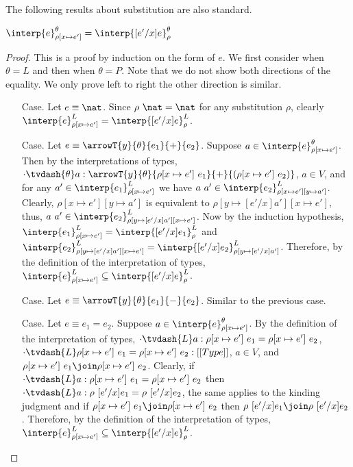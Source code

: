 \noindent
The following results about substitution are also standard.
\begin{lemma}
  \label{lemma:movable_subs}
  $\interp{e}^\theta_{\rho[x \mapsto e']} = \interp{[e'/x]e}^\theta_\rho$
\end{lemma}
\begin{proof}
  This is a proof by induction on the form of $e$.  We first consider when $\theta = L$ and
  then when $\theta = P$.  Note that we do not show both directions of the equality.  We only
  prove left to right the other direction is similar.
  
  \begin{itemize}
  \item[Case.] Let $e \equiv \nat$.  
    Since $\rho\ \nat = \nat$ for any substitution $\rho$, clearly
    $\interp{e}^L_{\rho[x \mapsto e']} = \interp{[e'/x]e}^L_\rho$.

  \item[Case.] Let $e \equiv \arrowT{y}{\theta}{e_1}{+}{e_2}$.  Suppose 
    $a \in \interp{e}^\theta_{\rho[x \mapsto e']}$.  Then by the interpretations of types,
    $\cdot \tvdash{\theta} a:
    \arrowT{y}{\theta}{\rho[x \mapsto e']\ e_1}{+}{(\rho[x \mapsto e']\ e_2)}$, 
    $a \in V$,
    and for any $a' \in \interp{e_1}^L_{\rho[x \mapsto e']}$ we have 
    $a\ a' \in \interp{e_2}^L_{\rho[x \mapsto e'][y \mapsto a']}$.  Clearly, 
    $\rho[x \mapsto e'][y \mapsto a']$ is equivalent to
    $\rho[y \mapsto [e'/x]a'][x \mapsto e']$, thus, 
    $a\ a' \in \interp{e_2}^L_{\rho[y \mapsto [e'/x]a'][x \mapsto e']}$.  Now by the induction
    hypothesis, $\interp{e_1}^L_{\rho[x \mapsto e']} = \interp{[e'/x]e_1}^L_{\rho}$ and
    $\interp{e_2}^L_{\rho[y \mapsto [e'/x]a'][x \mapsto e']} = 
    \interp{[e'/x]e_2}^L_{\rho[y \mapsto [e'/x]a']}$.  Therefore, by the definition of the 
    interpretation of types, $\interp{e}^L_{\rho[x \mapsto e']} \subseteq \interp{[e'/x]e}^L_\rho$.

  \item[Case.]  Let $e \equiv \arrowT{y}{\theta}{e_1}{-}{e_2}$.  Similar to the previous case.

  \item[Case.] Let $e \equiv e_1 = e_2$.  Suppose $a \in \interp{e}^\theta_{\rho[x \mapsto e']}$.
    By the definition of the interpretation of types, 
    $\cdot \tvdash{L} a:\rho[x \mapsto e']\ e_1 = \rho[x \mapsto e']\ e_2$, 
    $\cdot \tvdash{L} \rho[x \mapsto e']\ e_1 = \rho[x \mapsto e']\ e_2:[[Type]]$,
    $a \in V$, 
    and $\rho[x \mapsto e']\ e_1 \join \rho[x \mapsto e']\ e_2$.  Clearly, if 
    $\cdot \tvdash{L} a:\rho[x \mapsto e']\ e_1 = \rho[x \mapsto e']\ e_2$ then
    $\cdot \tvdash{L} a:\rho\ [e'/x]e_1 = \rho\ [e'/x]e_2$, the same applies to the kinding
    judgment and
    if $\rho[x \mapsto e']\ e_1 \join \rho[x \mapsto e']\ e_2$ then
    $\rho\ [e'/x]e_1 \join \rho\ [e'/x]e_2$.  Therefore, by the definition of the 
    interpretation of types, 
    $\interp{e}^L_{\rho[x \mapsto e']} \subseteq \interp{[e'/x]e}^L_\rho$.
  \end{itemize}
  

\end{proof}
